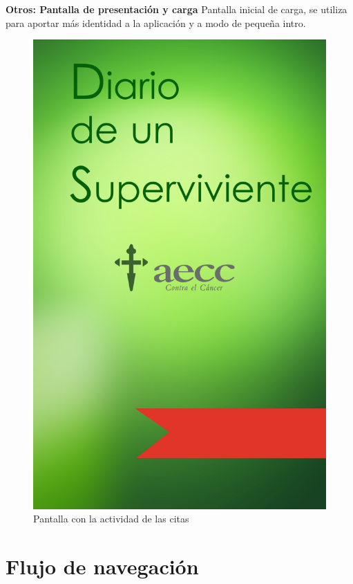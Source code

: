 \documentclass[../pfc.tex]{subfiles}
\begin{document}
			
			\textbf{Otros: Pantalla de presentación y carga}
			Pantalla inicial de carga, se utiliza para aportar más identidad a la aplicación y a modo de pequeña intro.
			
			\begin{figure}
				\centering
				\includegraphics[width=0.3\linewidth]{../images/flasher_pantalla_carga}
				\caption{Pantalla con la actividad de las citas}
				\label{fig:flasher_pantalla_carga}
			\end{figure}
			
			
		
	\section{Flujo de navegación}
	
	
\end{document}
